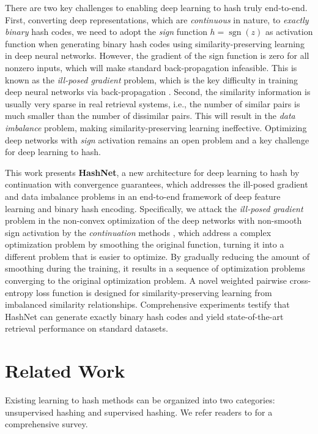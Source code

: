 \documentclass[10pt,twocolumn,letterpaper]{article}
\begin{document}
There are two key challenges to enabling deep learning to hash truly end-to-end. First, converting deep representations, which are \emph{continuous} in nature, to \emph{exactly binary} hash codes, we need to adopt the \emph{sign} function $h = \operatorname{sgn} \left( z \right)$ as activation function when generating binary hash codes using similarity-preserving learning in deep neural networks. However, the gradient of the sign function is zero for all nonzero inputs, which will make standard back-propagation infeasible. This is known as the \emph{ill-posed gradient} problem, which is the key difficulty in training deep neural networks via back-propagation \cite{cite:NC06DBN}. Second, the similarity information is usually very sparse in real retrieval systems, i.e., the number of similar pairs is much smaller than the number of dissimilar pairs. This will result in the \emph{data imbalance} problem, making similarity-preserving learning ineffective. Optimizing deep networks with \emph{sign} activation remains an open problem and a key challenge for deep learning to hash.

This work presents \textbf{HashNet}, a new architecture for deep learning to hash by continuation  with convergence guarantees, which addresses the ill-posed gradient and data imbalance problems in an end-to-end framework of deep feature learning and binary hash encoding. 
Specifically, we attack the \emph{ill-posed gradient} problem in the non-convex optimization of the deep networks with non-smooth sign activation by the \emph{continuation} methods \cite{cite:Book12Continuation}, which address a complex optimization problem by smoothing the original function, turning it into a different problem that is easier to optimize. By gradually reducing the amount of smoothing during the training, it results in a sequence of optimization problems converging to the original optimization problem. A novel weighted pairwise cross-entropy loss function is designed for similarity-preserving learning from imbalanced similarity relationships. Comprehensive experiments testify that HashNet can generate exactly binary hash codes and yield state-of-the-art retrieval performance on standard datasets.

\section{Related Work}
Existing learning to hash methods can be organized into two categories: unsupervised hashing and supervised hashing. We refer readers to \cite{cite:Arxiv14HashSurvey} for a comprehensive survey.
\end{document}
